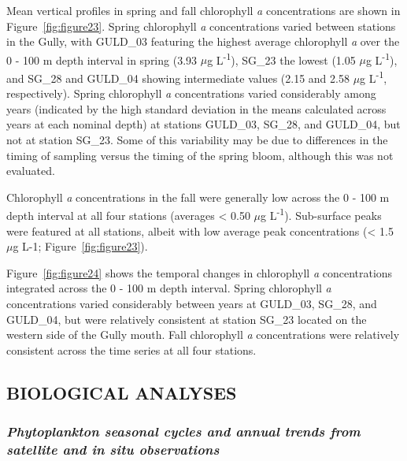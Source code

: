 \documentclass[12pt]{article}\usepackage[]{graphicx}\usepackage[]{color}
\begin{document}
Mean vertical profiles in spring and fall chlorophyll \emph{a} concentrations are shown in Figure~\ref{fig:figure23}. Spring chlorophyll \emph{a} concentrations varied between stations in the Gully, with GULD\_03 featuring the highest average chlorophyll \emph{a} over the 0 - 100 m depth interval in spring (3.93 \(\mu\)g L\textsuperscript{-1}), SG\_23 the lowest (1.05 \(\mu\)g L\textsuperscript{-1}), and SG\_28 and GULD\_04 showing intermediate values (2.15 and 2.58 \(\mu\)g L\textsuperscript{-1}, respectively). Spring chlorophyll \emph{a} concentrations varied considerably among years (indicated by the high standard deviation in the means calculated across years at each nominal depth) at stations GULD\_03, SG\_28, and GULD\_04, but not at station SG\_23. Some of this variability may be due to differences in the timing of sampling versus the timing of the spring bloom, although this was not evaluated.

Chlorophyll \emph{a} concentrations in the fall were generally low across the 0 - 100 m depth interval at all four stations (averages \textless{} 0.50 \(\mu\)g L\textsuperscript{-1}). Sub-surface peaks were featured at all stations, albeit with low average peak concentrations (\textless{} 1.5 \(\mu\)g L-1; Figure~\ref{fig:figure23}).

Figure~\ref{fig:figure24} shows the temporal changes in chlorophyll \emph{a} concentrations integrated across the 0 - 100 m depth interval. Spring chlorophyll \emph{a} concentrations varied considerably between years at GULD\_03, SG\_28, and GULD\_04, but were relatively consistent at station SG\_23 located on the western side of the Gully mouth. Fall chlorophyll \emph{a} concentrations were relatively consistent across the time series at all four stations.

\hypertarget{sec:biological-analyses}{%
\subsection{\texorpdfstring{\textbf{BIOLOGICAL ANALYSES}}{BIOLOGICAL ANALYSES}}\label{sec:biological-analyses}}

\hypertarget{phytoplankton-seasonal-cycles-and-annual-trends-from-satellite-and-in-situ-observations}{%
\subsubsection{\texorpdfstring{\emph{Phytoplankton seasonal cycles and annual trends from satellite and in situ observations}}{Phytoplankton seasonal cycles and annual trends from satellite and in situ observations}}\label{phytoplankton-seasonal-cycles-and-annual-trends-from-satellite-and-in-situ-observations}}
\end{document}
